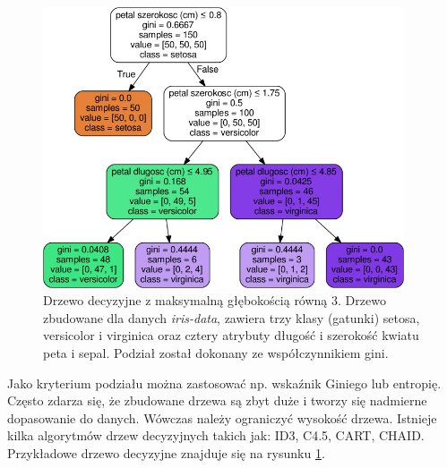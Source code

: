 \begin{figure}[H]
	\centering
	\includegraphics[width=0.95\textwidth]{./images/drzewo.jpg}
	\caption[Rysunek przykładowego drzewa decyzyjnego]{Drzewo decyzyjne z maksymalną głębokością równą 3. Drzewo zbudowane dla danych \textit{iris-data}, zawiera trzy klasy (gatunki) setosa, versicolor i virginica oraz cztery atrybuty długość i szerokość kwiatu peta i sepal. Podział został dokonany ze współczynnikiem gini.}
	\label{fig:drzewodec}
\end{figure}
Jako kryterium podziału można zastosować np. wskaźnik Giniego lub entropię. Często zdarza się, że zbudowane drzewa są zbyt duże i tworzy się nadmierne dopasowanie do danych. Wówczas należy ograniczyć wysokość drzewa.
Istnieje kilka algorytmów drzew decyzyjnych takich jak: ID3, C4.5, CART, CHAID. Przykładowe drzewo decyzyjne znajduje się na rysunku \ref{fig:drzewodec}.
